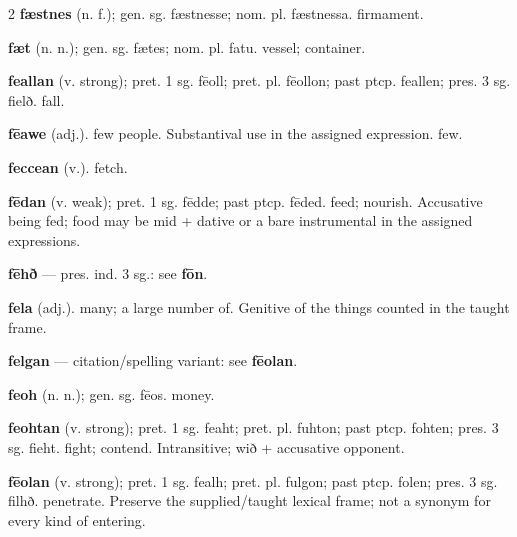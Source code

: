 \begin{multicols*}{2}
\textbf{fæstnes} (n. f.); gen. sg. fæstnesse; nom. pl. fæstnessa. firmament.\par
\textbf{fæt} (n. n.); gen. sg. fætes; nom. pl. fatu. vessel; container.\par
\textbf{feallan} (v. strong); pret. 1 sg. fēoll; pret. pl. fēollon; past ptcp. feallen; pres. 3 sg. fielð. fall.\par
\textbf{fēawe} (adj.). few people. Substantival use in the assigned expression. few.\par
\textbf{feccean} (v.). fetch.\par
\textbf{fēdan} (v. weak); pret. 1 sg. fēdde; past ptcp. fēded. feed; nourish. Accusative being fed; food may be mid + dative or a bare instrumental in the assigned expressions.\par
\textbf{fēhð} — pres. ind. 3 sg.: see \textbf{fōn}.\par
\textbf{fela} (adj.). many; a large number of. Genitive of the things counted in the taught frame.\par
\textbf{felgan} — citation/spelling variant: see \textbf{fēolan}.\par
\textbf{feoh} (n. n.); gen. sg. fēos. money.\par
\textbf{feohtan} (v. strong); pret. 1 sg. feaht; pret. pl. fuhton; past ptcp. fohten; pres. 3 sg. fieht. fight; contend. Intransitive; wið + accusative opponent.\par
\textbf{fēolan} (v. strong); pret. 1 sg. fealh; pret. pl. fulgon; past ptcp. folen; pres. 3 sg. filhð. penetrate. Preserve the supplied/taught lexical frame; not a synonym for every kind of entering.\par

\end{multicols*}
